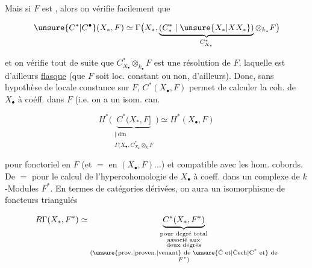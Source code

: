 
Mais si $F$  est  , alors on vérifie facilement que

\[
\unsure{C^{*}|C^{\bullet}}(X_*,F)\simeq\Gamma\bigl(X_*,\underbrace{(C^{*}_{*}\mid\unsure{X_{*}|XX_{*}})}_{C^{*}_{X_*}}\otimes_{k_*}F\bigr)
\]


et on vérifie tout de suite que $C^{*}_{X_\bullet}\otimes_{k_\bullet}F$ est une résolution de $F$, laquelle est d'ailleurs \uline{flasque}  (que $F$ soit loc. constant ou non, d'ailleurs). Donc, sans hypothèse de locale constance sur $F$, $C^{*}(X_\bullet,F)$ permet de calculer la coh. de $X_\bullet$ à coéff. dans $F$ (i.e. on a un isom. can.

\[
H^{*}\bigl(\underbrace{C^{*}(X_*,F]}_{\substack{\Vert\,\mathrm{dfn}\\\Gamma(X_\bullet,C^{*}_{X_\bullet}\otimes_k F}}\bigr)\simeq H^{*}(X_\bullet,F)
\]

pour  fonctoriel en $F$ (et $=$ en $(X_\bullet,F)\ldots$) et compatible avec les hom. cobords. De $=$ pour le calcul de l'hypercohomologie de $X_\bullet$ à coeff. dans un complexe de $k$-Modules $F^{*}$. En termes de catégories dérivées, on aura un isomorphisme de foncteurs triangulés

\[
R\Gamma(X_*,F^*)\simeq\underbrace{C^{*}(X_*,F^*)}_{\substack{\text{pour degré total}\\\text{associé aux}\\\text{deux degrés}\\\text{(\unsure{prov.|proven.|venant} de \unsure{\v{C} et|\v{C}ech|C\textsuperscript{*} et} de}\\ F^{*}\text{)}}}
\]

